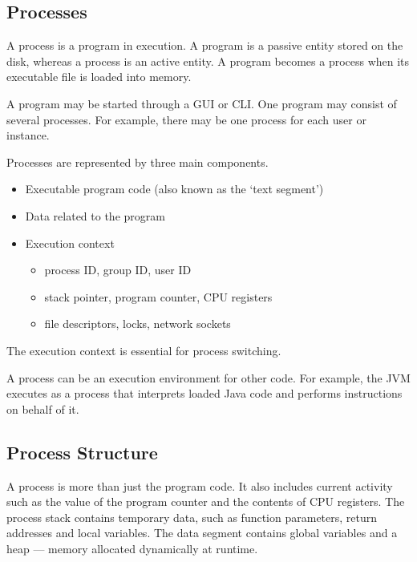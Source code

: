 \subsection{Processes}

A process is a program in execution.
A program is a passive entity stored on the disk, whereas a process is an active entity.
A program becomes a process when its executable file is loaded into memory.

A program may be started through a GUI or CLI\@.
One program may consist of several processes.
For example, there may be one process for each user or instance.

Processes are represented by three main components.
\begin{itemize}
  \item Executable program code (also known as the `text segment')
  \item Data related to the program
  \item Execution context
  \begin{itemize}
    \item process ID, group ID, user ID
    \item stack pointer, program counter, CPU registers
    \item file descriptors, locks, network sockets
  \end{itemize}
\end{itemize}
The execution context is essential for process switching.

A process can be an execution environment for other code.
For example, the JVM executes as a process that interprets loaded Java code and performs instructions on behalf of it.

\subsection{Process Structure}

A process is more than just the program code.
It also includes current activity such as the value of the program counter and the contents of CPU registers.
The process stack contains temporary data, such as function parameters, return addresses and local variables.
The data segment contains global variables and a heap --- memory allocated dynamically at runtime.

